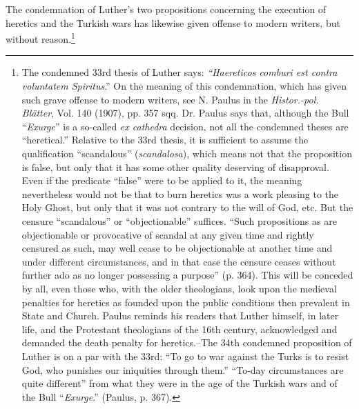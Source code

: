 The condemnation of Luther’s two propositions concerning the
execution of heretics and the Turkish wars has likewise given offense
to modern writers, but without reason.\footnote
{The condemned 33rd thesis of Luther says: \textit{``Haereticos comburi est contra voluntatem
Spiritus}.'' On the meaning of this condemnation, which has given such grave offense to
modern writers, see N. Paulus in the \textit{Histor.-pol. Blätter}, Vol. 140 (1907), pp. 357 sqq.
Dr. Paulus says that, although the Bull “\textit{Exurge}” is a so-called \textit{ex cathedra} decision, not all
the condemned theses are “heretical.” Relative to the 33rd thesis, it is sufficient to assume
the qualification “scandalous” (\textit{scandalosa}), which means not that the proposition is false,
but only that it has some other quality deserving of disapproval. Even if the predicate
“false” were to be applied to it, the meaning nevertheless would not be that to burn
heretics was a work pleasing to the Holy Ghost, but only that it was not contrary to the
will of God, etc. But the censure “scandalous” or “objectionable” suffices. “Such propositions
as are objectionable or provocative of scandal at any given time and rightly censured as such,
may well cease to be objectionable at another time and under different circumstances, and
in that case the censure ceases without further ado as no longer possessing a purpose”
(p. 364). This will be conceded by all, even those who, with the older theologians, look
upon the medieval penalties for heretics as founded upon the public conditions
then prevalent in State and Church. Paulus reminds his readers that Luther himself, in later life,
and the Protestant theologians of the 16th century, acknowledged and demanded the death
penalty for heretics.--The 34th condemned proposition of Luther is on a par with the
33rd: “To go to war against the Turks is to resist God, who punishes our iniquities
through them.” “To-day circumstances are quite different” from what they were in the
age of the Turkish wars and of the Bull ``\textit{Exurge}.'' (Paulus, p. 367).}
